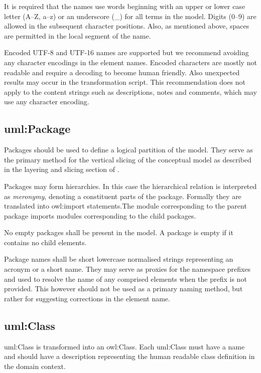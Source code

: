 	It is required that the names use words beginning with an upper or lower case letter (A--Z, a--z) or an underscore (\_) for all terms in the model. Digits (0--9) are allowed in the subsequent character positions. Also, as mentioned above, spaces are permitted in the local segment of the name. 
	
	Encoded UTF-8 and UTF-16 names are supported \cite{xml1-spec,xml11-spec} but we recommend avoiding any character encodings in the element names. Encoded characters are mostly not readable and require a decoding to become human friendly. Also unexpected results may occur in the transformation script. This recommendation does not apply to the content strings such as descriptions, notes and comments, which may use any character encoding. 
	
	\subsection{uml:Package}
	\label{sec:uml-package}
	
	Packages should be used to define a logical partition of the model. They serve as the primary method for the vertical slicing of the conceptual model as described in the layering and slicing section of \citet{costetchi2020a}. 
	
	Packages may form hierarchies. In this case the hierarchical relation is interpreted as \textit{meronymy}, denoting a constituent parts of the package. Formally they are translated into owl:import statements.The module corresponding to the parent package imports modules corresponding to the child packages.
	
	No empty packages shall be present in the model. A package is empty if it contains no child elements. 
	
	Package names shall be short lowercase normalised strings representing an acronym or a short name. They may serve as proxies for the namespace prefixes and used to resolve the name of any comprised elements when the prefix is not provided. This however should not be used as a primary naming method, but rather for suggesting corrections in the element name. 
	
	\subsection{uml:Class}
	\label{sec:uml-class}
	
	uml:Class is transformed into an owl:Class. Each uml:Class must have a name and should have a description representing the human readable class definition in the domain context. 
	
